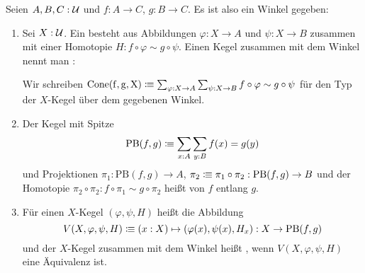 \begin{definition}
  Seien $A,B,C:\mathcal{U}$ und $f:A\to C$, $g:B\to C$. Es ist also ein Winkel gegeben:
  \begin{center}
  \end{center}
  \begin{enumerate}
  \item Sei $X:\mathcal{U}$. Ein  besteht aus Abbildungen $\varphi:X\to A$ und $\psi:X\to B$ zusammen mit einer Homotopie $H:f\circ \varphi \sim g\circ \psi$.
    Einen Kegel zusammen mit dem Winkel nennt man :
    \begin{center}
    \end{center}
      Wir schreiben $\mathrm{Cone(f,g,X)}\vcentcolon\mspace{-1.2mu}\equiv\sum_{\varphi:X \to A}\sum_{\psi:X \to B}f\circ\varphi \sim g\circ\psi$ für den Typ der $X$-Kegel über dem gegebenen Winkel.
  \item Der Kegel mit Spitze
    \[
      \mathrm{PB}(f,g)\vcentcolon\mspace{-1.2mu}\equiv \sum_{x:A}\sum_{y:B}f(x)=g(y)
    \]
    und Projektionen $\pi_1:\mathrm{PB}(f,g)\to A$, $\pi_2\vcentcolon\mspace{-1.2mu}\equiv \pi_1\circ \pi_2:\mathrm{PB}(f,g)\to B$ und der Homotopie $\pi_2\circ\pi_2:f\circ \pi_1 \sim g\circ \pi_2$ heißt  von $f$ entlang $g$.
  \item Für einen $X$-Kegel $(\varphi,\psi,H)$ heißt die Abbildung
    \[
      V(X,\varphi,\psi,H)\vcentcolon\mspace{-1.2mu}\equiv (x:X)\mapsto (\varphi(x),\psi(x),H_x) : X \to \mathrm{PB}(f,g)
    \]
     und der $X$-Kegel zusammen mit dem Winkel heißt , wenn $V(X,\varphi,\psi,H)$ eine Äquivalenz ist.
  \end{enumerate}
\end{definition}


